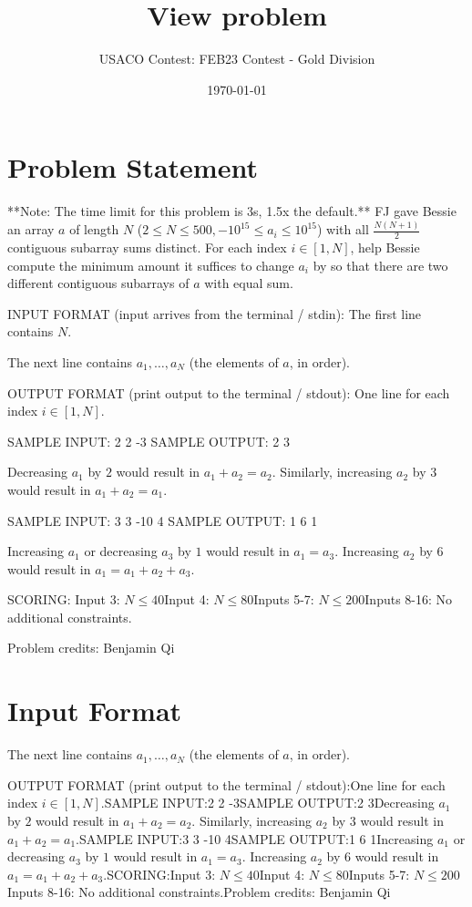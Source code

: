 \documentclass[12pt]{article}
\title{View problem}
\author{USACO Contest: FEB23 Contest - Gold Division}
\date{\today}
\begin{document}
\maketitle

\section*{Problem Statement}


**Note: The time limit for this problem is 3s, 1.5x the default.**
FJ gave Bessie an array $a$ of length $N$
($2\le N\le 500, -10^{15}\le a_i\le 10^{15}$) with all $\frac{N(N+1)}{2}$
contiguous subarray sums distinct. For each index $i\in [1,N]$, help Bessie
compute the minimum amount it suffices to change $a_i$ by so that there are two
different contiguous subarrays of $a$ with equal sum.

INPUT FORMAT (input arrives from the terminal / stdin):
The first line contains $N$.

The next line contains $a_1,\dots, a_N$ (the elements of $a$, in order).

OUTPUT FORMAT (print output to the terminal / stdout):
One line for each index $i\in [1,N]$.

SAMPLE INPUT:
2
2 -3
SAMPLE OUTPUT: 
2
3

Decreasing $a_1$ by $2$ would result in $a_1+a_2=a_2$. Similarly, increasing
$a_2$ by $3$ would result in $a_1+a_2=a_1$.

SAMPLE INPUT:
3
3 -10 4
SAMPLE OUTPUT: 
1
6
1

Increasing $a_1$ or decreasing $a_3$ by $1$ would result in $a_1=a_3$.
Increasing $a_2$ by $6$ would result in $a_1=a_1+a_2+a_3$.

SCORING:
Input 3: $N\le 40$Input 4: $N \le 80$Inputs 5-7: $N \le 200$Inputs 8-16: No additional constraints.


Problem credits: Benjamin Qi



\section*{Input Format}
The next line contains $a_1,\dots, a_N$ (the elements of $a$, in order).

OUTPUT FORMAT (print output to the terminal / stdout):One line for each index $i\in [1,N]$.SAMPLE INPUT:2
2 -3SAMPLE OUTPUT:2
3Decreasing $a_1$ by $2$ would result in $a_1+a_2=a_2$. Similarly, increasing
$a_2$ by $3$ would result in $a_1+a_2=a_1$.SAMPLE INPUT:3
3 -10 4SAMPLE OUTPUT:1
6
1Increasing $a_1$ or decreasing $a_3$ by $1$ would result in $a_1=a_3$.
Increasing $a_2$ by $6$ would result in $a_1=a_1+a_2+a_3$.SCORING:Input 3: $N\le 40$Input 4: $N \le 80$Inputs 5-7: $N \le 200$Inputs 8-16: No additional constraints.Problem credits: Benjamin Qi
\end{document}
